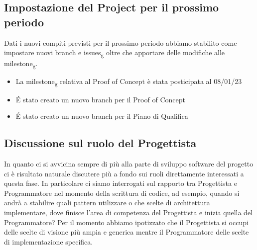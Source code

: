 \subsection{Impostazione del Project per il prossimo periodo}
Dati i nuovi compiti previsti per il prossimo periodo abbiamo stabilito come impostare nuovi branch e issues\textsubscript{g} oltre che apportare delle modifiche alle milestone\textsubscript{g}.
\begin{itemize}
	\item La milestone\textsubscript{g} relativa al Proof of Concept è stata posticipata al 08/01/23
	\item É stato creato un nuovo branch per il Proof of Concept
	\item É stato creato un nuovo branch per il Piano di Qualifica
\end{itemize}

\subsection{Discussione sul ruolo del Progettista}
In quanto ci si avvicina sempre di più alla parte di sviluppo software del progetto ci è risultato naturale discutere più a fondo sui ruoli direttamente interessati a questa fase.
\newline In particolare ci siamo interrogati sul rapporto tra Progettista e Programmatore nel momento della scrittura di codice, ad esempio, quando si andrà a stabilire quali pattern utilizzare o che scelte di architettura implementare, dove finisce l'area di competenza del Progettista e inizia quella del Programmatore?
\newline Per il momento abbiamo ipotizzato che il Progettista si occupi delle scelte di visione più ampia e generica mentre il Programmatore delle scelte di implementazione specifica.